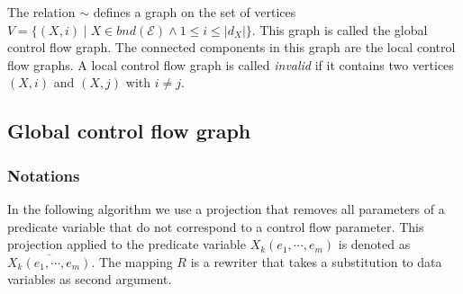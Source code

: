 The relation $\sim $ defines a graph on the set of vertices $V=\{(X,i)\mid
X\in bnd(\mathcal{E})\wedge 1\leq i\leq \left\vert d_{X}\right\vert \}$.
This graph is called the global control flow graph. The connected components
in this graph are the local control flow graphs. A local control flow graph
is called \emph{invalid} if it contains two vertices $(X,i)$ and $(X,j)$
with $i\neq j$. \newpage

\subsection{Global control flow graph}

\subsubsection{Notations}

In the following algorithm we use a projection that removes all parameters
of a predicate variable that do not correspond to a control flow parameter.
This projection applied to the predicate variable $X_{k}(e_{1},\cdots
,e_{m}) $ is denoted as $\overline{X_{k}(e_{1},\cdots ,e_{m})}$. The mapping 
$R$ is a rewriter that takes a substitution to data variables as second
argument.

